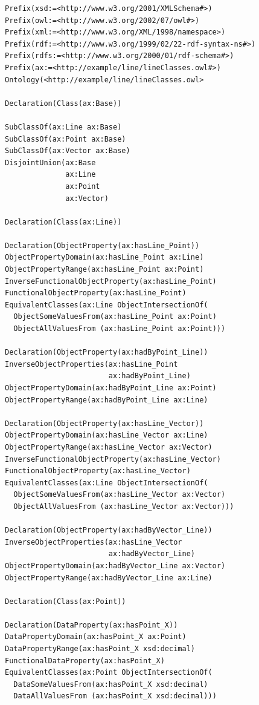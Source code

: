 \documentclass[preprint,12pt]{elsarticle}
\begin{document}
\begin{verbatim}
Prefix(xsd:=<http://www.w3.org/2001/XMLSchema#>)
Prefix(owl:=<http://www.w3.org/2002/07/owl#>)
Prefix(xml:=<http://www.w3.org/XML/1998/namespace>)
Prefix(rdf:=<http://www.w3.org/1999/02/22-rdf-syntax-ns#>)
Prefix(rdfs:=<http://www.w3.org/2000/01/rdf-schema#>)
Prefix(ax:=<http://example/line/lineClasses.owl#>)
Ontology(<http://example/line/lineClasses.owl>

Declaration(Class(ax:Base))

SubClassOf(ax:Line ax:Base)
SubClassOf(ax:Point ax:Base)
SubClassOf(ax:Vector ax:Base)
DisjointUnion(ax:Base
              ax:Line
              ax:Point
              ax:Vector)

Declaration(Class(ax:Line))

Declaration(ObjectProperty(ax:hasLine_Point))
ObjectPropertyDomain(ax:hasLine_Point ax:Line)
ObjectPropertyRange(ax:hasLine_Point ax:Point)
InverseFunctionalObjectProperty(ax:hasLine_Point)
FunctionalObjectProperty(ax:hasLine_Point)
EquivalentClasses(ax:Line ObjectIntersectionOf(
  ObjectSomeValuesFrom(ax:hasLine_Point ax:Point)
  ObjectAllValuesFrom (ax:hasLine_Point ax:Point)))

Declaration(ObjectProperty(ax:hadByPoint_Line))
InverseObjectProperties(ax:hasLine_Point
                        ax:hadByPoint_Line)
ObjectPropertyDomain(ax:hadByPoint_Line ax:Point)
ObjectPropertyRange(ax:hadByPoint_Line ax:Line)

Declaration(ObjectProperty(ax:hasLine_Vector))
ObjectPropertyDomain(ax:hasLine_Vector ax:Line)
ObjectPropertyRange(ax:hasLine_Vector ax:Vector)
InverseFunctionalObjectProperty(ax:hasLine_Vector)
FunctionalObjectProperty(ax:hasLine_Vector)
EquivalentClasses(ax:Line ObjectIntersectionOf(
  ObjectSomeValuesFrom(ax:hasLine_Vector ax:Vector)
  ObjectAllValuesFrom (ax:hasLine_Vector ax:Vector)))

Declaration(ObjectProperty(ax:hadByVector_Line))
InverseObjectProperties(ax:hasLine_Vector
                        ax:hadByVector_Line)
ObjectPropertyDomain(ax:hadByVector_Line ax:Vector)
ObjectPropertyRange(ax:hadByVector_Line ax:Line)

Declaration(Class(ax:Point))

Declaration(DataProperty(ax:hasPoint_X))
DataPropertyDomain(ax:hasPoint_X ax:Point)
DataPropertyRange(ax:hasPoint_X xsd:decimal)
FunctionalDataProperty(ax:hasPoint_X)
EquivalentClasses(ax:Point ObjectIntersectionOf(
  DataSomeValuesFrom(ax:hasPoint_X xsd:decimal)
  DataAllValuesFrom (ax:hasPoint_X xsd:decimal)))


\end{verbatim}
\end{document}
